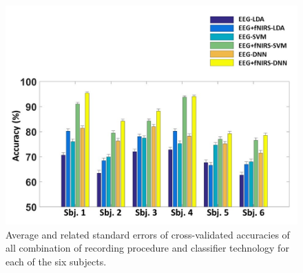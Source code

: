 \documentclass[12pt]{iopart}
\begin{document}
\begin{figure}
	\includegraphics[width=\linewidth]{Slide6.JPG}
	\caption{Average and related standard errors of cross-validated accuracies of all combination of recording procedure and classifier technology for each of the six subjects.}
	\label{fig:fig6}
\end{figure}
\end{document}
